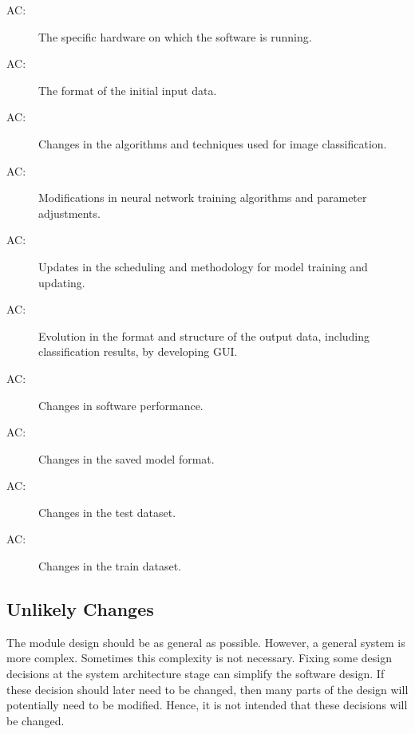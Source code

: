 \documentclass[12pt, titlepage]{article}
\newcounter{acnum}
\newcommand{\actheacnum}{AC\theacnum}
\begin{document}
\begin{description}
\item[ \actheacnum \label{acHardware}:] The specific
  hardware on which the software is running.
\item[ \actheacnum \label{acInput}:] The format of the
  initial input data.
\item[ \actheacnum \label{algo}:] Changes in the 
  algorithms and techniques used for image classification.
\item[ \actheacnum \label{ANNAlgo}:] Modifications in 
  neural network training algorithms and parameter adjustments.
\item[ \actheacnum \label{modelTraining}:] Updates in the 
  scheduling and methodology for model training and updating.
\item[ \actheacnum \label{acOutput}:] Evolution in the 
  format and structure of the output data, including classification results, 
  by developing GUI.
\item[ \actheacnum \label{acControl}:] Changes in software performance.
\item[ \actheacnum \label{acANN}:] Changes in the saved model format.
\item[ \actheacnum \label{acTestData}:] Changes in the test dataset.
\item[ \actheacnum \label{acTrainData}:] Changes in the train dataset.
\end{description}

\subsection{Unlikely Changes} \label{SecUchange}

The module design should be as general as possible. However, a general system is
more complex. Sometimes this complexity is not necessary. Fixing some design
decisions at the system architecture stage can simplify the software design. If
these decision should later need to be changed, then many parts of the design
will potentially need to be modified. Hence, it is not intended that these
decisions will be changed.
\end{document}
